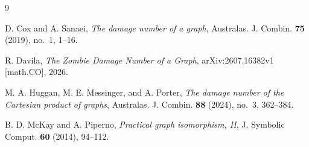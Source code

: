 \documentclass[11pt]{amsart}
\begin{document}
\begin{thebibliography}{9}

D. Cox and A. Sanaei,
\emph{The damage number of a graph},
Australas. J. Combin. \textbf{75} (2019), no.~1, 1--16.

R. Davila,
\emph{The Zombie Damage Number of a Graph},
arXiv:2607.16382v1 [math.CO], 2026.

M. A. Huggan, M. E. Messinger, and A. Porter,
\emph{The damage number of the Cartesian product of graphs},
Australas. J. Combin. \textbf{88} (2024), no.~3, 362--384.

B. D. McKay and A. Piperno,
\emph{Practical graph isomorphism, II},
J. Symbolic Comput. \textbf{60} (2014), 94--112.

\end{thebibliography}
\end{document}
